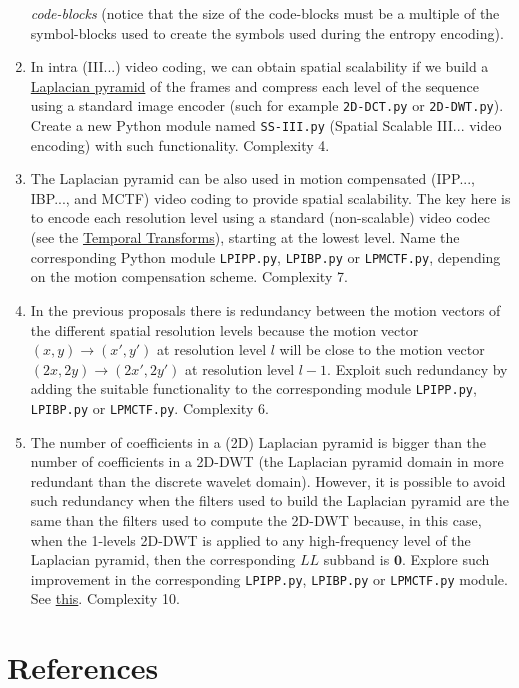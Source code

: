 \begin{enumerate}
  \emph{code-blocks} (notice that the size of the code-blocks must be
  a multiple of the symbol-blocks used to create the symbols used
  during the entropy encoding). 
\item In intra (III...) video coding, we can obtain spatial
  scalability if we build a
  \href{https://en.wikipedia.org/wiki/Pyramid_(image_processing)#Laplacian_pyramid}{Laplacian
    pyramid} of the frames and compress each level of the sequence
  using a standard image encoder (such for example \texttt{2D-DCT.py}
  or \texttt{2D-DWT.py}). Create a new Python module named
  \texttt{SS-III.py} (Spatial Scalable III... video encoding) with
  such functionality. Complexity 4.
\item The Laplacian pyramid can be also used in motion compensated
  (IPP..., IBP..., and MCTF) video coding to provide spatial
  scalability. The key here is to encode each resolution level using a
  standard (non-scalable) video codec (see the
  \href{https://sistemas-multimedia.github.io/contents/temporal_transforms/}{Temporal
    Transforms}), starting at the lowest level. Name the corresponding
  Python module \texttt{LPIPP.py}, \texttt{LPIBP.py} or
  \texttt{LPMCTF.py}, depending on the motion compensation
  scheme. Complexity 7.
\item In the previous proposals there is redundancy between the motion
  vectors of the different spatial resolution levels because the
  motion vector $(x, y)\rightarrow (x', y')$ at resolution level $l$
  will be close to the motion vector $(2x, 2y)\rightarrow(2x',2y')$ at
  resolution level $l-1$. Exploit such redundancy by adding the
  suitable functionality to the corresponding module
  \texttt{LPIPP.py}, \texttt{LPIBP.py} or
  \texttt{LPMCTF.py}. Complexity 6.
\item The number of coefficients in a (2D) Laplacian pyramid is bigger
  than the number of coefficients in a 2D-DWT (the Laplacian pyramid
  domain in more redundant than the discrete wavelet domain). However,
  it is possible to avoid such redundancy when the filters used to
  build the Laplacian pyramid are the same than the filters used to
  compute the 2D-DWT because, in this case, when the 1-levels 2D-DWT
  is applied to any high-frequency level of the Laplacian pyramid,
  then the corresponding $LL$ subband is $\mathbf{0}$. Explore such
  improvement in the corresponding \texttt{LPIPP.py},
  \texttt{LPIBP.py} or \texttt{LPMCTF.py} module. See
  \href{https://vicente-gonzalez-ruiz.github.io/pyramids-and-wavelets/}{this}.
  Complexity 10.
\end{enumerate}

\section{References}

\renewcommand{\addcontentsline}[3]{}%

